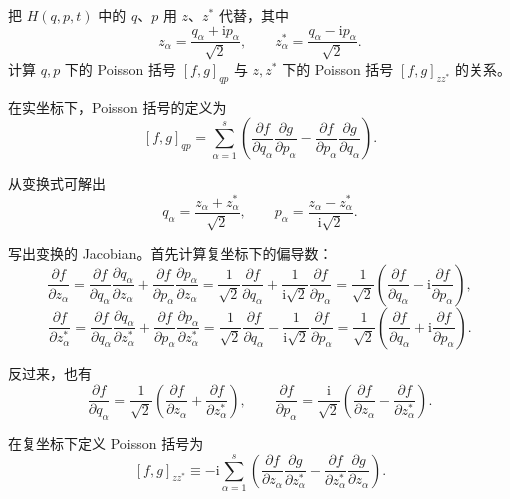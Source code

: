 


\begin{question}
把 \(H(q,p,t)\) 中的 \(q\)、\(p\) 用 \(z\)、\(z^*\) 代替，其中
\[
z_\alpha = \frac{q_\alpha+\mathrm i p_\alpha}{\sqrt2},\qquad
z_\alpha^* = \frac{q_\alpha-\mathrm i p_\alpha}{\sqrt2}.
\]
计算 \(q,p\) 下的 Poisson 括号 \([f,g]_{qp}\) 与 \(z,z^*\) 下的 Poisson 括号 \([f,g]_{zz^*}\) 的关系。
\begin{solution}
在实坐标下，Poisson 括号的定义为
\[
[f,g]_{qp}=\sum_{\alpha=1}^s\left(
\frac{\partial f}{\partial q_\alpha}\frac{\partial g}{\partial p_\alpha}
-\frac{\partial f}{\partial p_\alpha}\frac{\partial g}{\partial q_\alpha}
\right).
\]

从变换式可解出
\[
q_\alpha = \frac{z_\alpha+z_\alpha^*}{\sqrt2},\qquad
p_\alpha = \frac{z_\alpha-z_\alpha^*}{\mathrm i\sqrt2}.
\]

写出变换的 Jacobian。首先计算复坐标下的偏导数：
\[
\frac{\partial f}{\partial z_\alpha}
= \frac{\partial f}{\partial q_\alpha}\frac{\partial q_\alpha}{\partial z_\alpha}
+\frac{\partial f}{\partial p_\alpha}\frac{\partial p_\alpha}{\partial z_\alpha}
= \frac{1}{\sqrt2}\frac{\partial f}{\partial q_\alpha}
+\frac{1}{\mathrm i\sqrt2}\frac{\partial f}{\partial p_\alpha}
= \frac{1}{\sqrt2}\left(\frac{\partial f}{\partial q_\alpha}
-\mathrm i\frac{\partial f}{\partial p_\alpha}\right),
\]
\[
\frac{\partial f}{\partial z_\alpha^*}
= \frac{\partial f}{\partial q_\alpha}\frac{\partial q_\alpha}{\partial z_\alpha^*}
+\frac{\partial f}{\partial p_\alpha}\frac{\partial p_\alpha}{\partial z_\alpha^*}
= \frac{1}{\sqrt2}\frac{\partial f}{\partial q_\alpha}
-\frac{1}{\mathrm i\sqrt2}\frac{\partial f}{\partial p_\alpha}
= \frac{1}{\sqrt2}\left(\frac{\partial f}{\partial q_\alpha}
+\mathrm i\frac{\partial f}{\partial p_\alpha}\right).
\]

反过来，也有
\[
\frac{\partial f}{\partial q_\alpha}
= \frac{1}{\sqrt2}\left(
\frac{\partial f}{\partial z_\alpha}+\frac{\partial f}{\partial z_\alpha^*}
\right),\qquad
\frac{\partial f}{\partial p_\alpha}
= \frac{\mathrm i}{\sqrt2}\left(
\frac{\partial f}{\partial z_\alpha}-\frac{\partial f}{\partial z_\alpha^*}
\right).
\]

在复坐标下定义 Poisson 括号为
\[
[f,g]_{zz^*}
\equiv -\mathrm i\sum_{\alpha=1}^s\left(
\frac{\partial f}{\partial z_\alpha}\frac{\partial g}{\partial z_\alpha^*}
-\frac{\partial f}{\partial z_\alpha^*}\frac{\partial g}{\partial z_\alpha}
\right).
\]


\end{solution}
\end{question}
